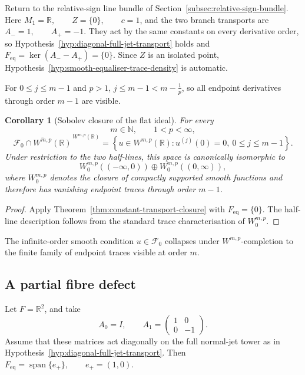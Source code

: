 \documentclass[11pt]{article}
\theoremstyle{plain}
\newtheorem{corollary}[theorem]{Corollary}
\theoremstyle{definition}
\begin{document}
Return to the relative-sign line bundle of
Section~\ref{subsec:relative-sign-bundle}. Here
\(M_1=\mathbb R, \qquad Z=\{0\}, \qquad c=1\),
and the two branch transports are
\(A_-=1, \qquad A_+=-1\).
They act by the same constants on every derivative order, so
Hypothesis~\ref{hyp:diagonal-full-jet-transport} holds and
\(F_{\mathrm{eq}} = \ker(A_--A_+) = \{0\}\).
Since \(Z\) is an isolated point,
Hypothesis~\ref{hyp:smooth-equaliser-trace-density} is automatic.

For \(0\leq j\leq m-1\) and \(p>1\),
\(j \leq m-1 < m-\frac{1}{p}\),
so all endpoint derivatives through order \(m-1\) are visible.

\begin{corollary}[Sobolev closure of the flat ideal]
\label{cor:flat-ideal-sobolev-closure}
For every
\[
  m\in\mathbb N,
  \qquad
  1<p<\infty,
\]
\[
  \boxed{
  \overline{
    \mathcal F_0
    \cap
    W^{m,p}(\mathbb R)
  }^{\,W^{m,p}(\mathbb R)}
  =
  \left\{
    u\in W^{m,p}(\mathbb R):
    u^{(j)}(0)=0,\
    0\leq j\leq m-1
  \right\}.
  }
\]
Under restriction to the two half-lines, this space is canonically
isomorphic to
\[
  W_0^{m,p}((-\infty,0))
  \oplus
  W_0^{m,p}((0,\infty)),
\]
where \(W_0^{m,p}\) denotes the closure of compactly supported smooth
functions and therefore has vanishing endpoint traces through order
\(m-1\).
\end{corollary}

\begin{proof}
Apply
Theorem~\ref{thm:constant-transport-closure}
with
\(F_{\mathrm{eq}}=\{0\}\).
The half-line description follows from the standard trace
characterisation of \(W_0^{m,p}\).
\end{proof}

The infinite-order smooth condition \(u\in\mathcal F_0\) collapses under \(W^{m,p}\)-completion to the finite family of endpoint
traces visible at order \(m\).

\subsection{A partial fibre defect}
\label{subsec:partial-fibre-defect}

Let
\(F=\mathbb R^2\),
and take
\[
  A_0=I,
  \qquad
  A_1
  =
  \begin{pmatrix}
    1&0\\
    0&-1
  \end{pmatrix}.
\]
Assume that these matrices act diagonally on the full normal-jet tower
as in
Hypothesis~\ref{hyp:diagonal-full-jet-transport}. Then
\(F_{\mathrm{eq}} = \operatorname{span}\{e_+\}, \qquad e_+=(1,0)\).
\end{document}

